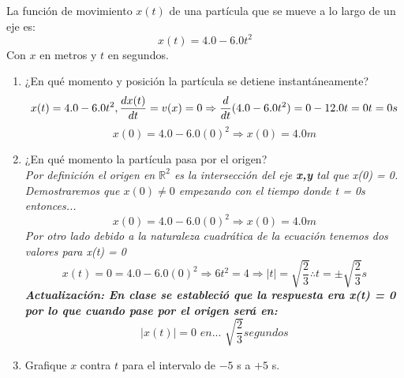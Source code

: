 \documentclass{article}
\begin{document}
La función de movimiento \(x(t)\) de una partícula que se mueve a lo largo de un eje es: 
  \[x(t) = 4.0 - 6.0t^2\]
Con \(x\) en metros y \(t\) en segundos.
\begin{enumerate}
  \item ¿En qué momento y posición la partícula se detiene instantáneamente?\\
  \[
  x(t) = 4.0 - 6.0t^2, \frac{dx(t)}{dt} = v(x) = 0 \Rightarrow
  \frac{d}{dt}(4.0 - 6.0t^2) = 0\\\\
  -12.0t = 0
  t = 0s\\\\
  \]
  \[ x(0) = 4.0 - 6.0(0)^2 \Rightarrow x(0) = 4.0m \]
  

  \item ¿En qué momento la partícula pasa por el origen?\\
\textit{Por definición el origen en \(\mathbb{R}^2\) es la intersección del eje \textbf{x,y} tal que x(0) = 0. Demostraremos que \(x(0) \neq 0\) empezando con el tiempo donde t = 0s entonces...}
\[x(0) = 4.0 - 6.0(0)^2 \Rightarrow x(0) = 4.0m\]
\textit{Por otro lado debido a la naturaleza cuadrática de la ecuación tenemos dos valores para x(t) = 0}
\[
x(t) = 0 = 4.0 - 6.0(0)^2 \Rightarrow
6t^2 = 4 \Rightarrow |t| = \sqrt{\frac{2}{3}}
\therefore t = \pm \sqrt{\frac{2}{3}}s
\]
\textit{\textbf{Actualización: En clase se estableció que la respuesta era x(t) = 0 por lo que cuando pase por el origen será en:}}
\[ |x(t)| = 0 \textit{  en... }\sqrt{\frac{2}{3}} segundos \]

  
  \item Grafique \(x\) contra \(t\) para el intervalo de \(-5\) s a \(+5\) s.\\
  
\begin{center}
\end{center}


\end{enumerate}
\end{document}
